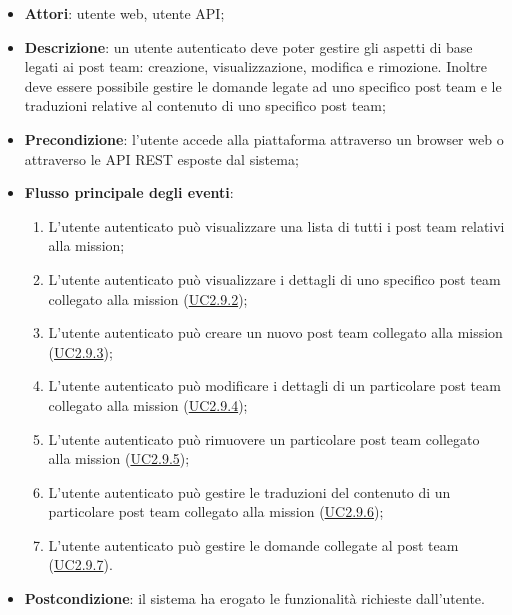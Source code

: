 \begin{itemize}
\item \textbf{Attori}: utente web, utente API;
\item \textbf{Descrizione}: un utente autenticato deve poter gestire gli aspetti di base legati ai post team: creazione, visualizzazione, modifica e rimozione. Inoltre deve essere possibile gestire le domande legate ad uno specifico post team e le traduzioni relative al contenuto di uno specifico post team; 
      \item \textbf{Precondizione}: l'utente accede alla piattaforma attraverso un browser web o attraverso le API REST esposte dal sistema;

        \item \textbf{Flusso principale degli eventi}:
          \begin{enumerate}
          \item L'utente autenticato può visualizzare una lista di tutti i post team relativi alla mission;
          \item L'utente autenticato può visualizzare i dettagli di uno specifico post team collegato alla mission (\hyperlink{UC2.9.2}{UC2.9.2});
          \item L'utente autenticato può creare un nuovo post team collegato alla mission (\hyperlink{UC2.9.3}{UC2.9.3});
          \item L'utente autenticato può modificare i dettagli di un particolare post team collegato alla mission (\hyperlink{UC2.9.4}{UC2.9.4});
          \item L'utente autenticato può rimuovere un particolare post team collegato alla mission (\hyperlink{UC2.9.5}{UC2.9.5});
          \item L'utente autenticato può gestire le traduzioni del contenuto di un particolare post team collegato alla mission (\hyperlink{UC2.9.6}{UC2.9.6});
          \item L'utente autenticato può gestire le domande collegate al post team (\hyperlink{UC2.9.7}{UC2.9.7}).

      \end{enumerate}
    \item \textbf{Postcondizione}: il sistema ha erogato le funzionalità richieste dall'utente.
  \end{itemize}

\hypertarget{UC2.9.2}{}
